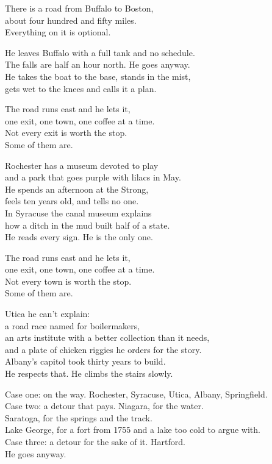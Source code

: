 \begin{lyrics}
There is a road from Buffalo to Boston,\\
about four hundred and fifty miles.\\
Everything on it is optional.

He leaves Buffalo with a full tank and no schedule.\\
The falls are half an hour north. He goes anyway.\\
He takes the boat to the base, stands in the mist,\\
gets wet to the knees and calls it a plan.

The road runs east and he lets it,\\
one exit, one town, one coffee at a time.\\
Not every exit is worth the stop.\\
Some of them are.

Rochester has a museum devoted to play\\
and a park that goes purple with lilacs in May.\\
He spends an afternoon at the Strong,\\
feels ten years old, and tells no one.\\
In Syracuse the canal museum explains\\
how a ditch in the mud built half of a state.\\
He reads every sign. He is the only one.

The road runs east and he lets it,\\
one exit, one town, one coffee at a time.\\
Not every town is worth the stop.\\
Some of them are.

Utica he can't explain:\\
a road race named for boilermakers,\\
an arts institute with a better collection than it needs,\\
and a plate of chicken riggies he orders for the story.\\
Albany's capitol took thirty years to build.\\
He respects that. He climbs the stairs slowly.

Case one: on the way. Rochester, Syracuse, Utica, Albany, Springfield.\\
Case two: a detour that pays. Niagara, for the water.\\
Saratoga, for the springs and the track.\\
Lake George, for a fort from 1755 and a lake too cold to argue with.\\
Case three: a detour for the sake of it. Hartford.\\
He goes anyway.


\end{lyrics}
